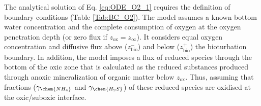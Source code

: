 \documentclass[gmd, manuscript]{copernicus}
\begin{document}
The analytical solution of Eq. \eqref{eq:ODE_O2_1} requires the definition of boundary conditions (Table \ref{Tab:BC_O2}). 
The model assumes a known bottom water concentration and the complete consumption of oxygen at the oxygen penetration depth (or zero flux if $z_{\mathrm{ox}}=z_\infty$). 
It considers equal oxygen concentration and diffusive flux above ($z_{\mathrm{bio}}^-$) and 
below ($z_{\mathrm{bio}}^+$) the bioturbation boundary. In addition, the model imposes a flux of reduced species through the bottom of the oxic zone that is calculated as the reduced substances produced through anoxic mineralization 
of organic matter below $z_{\mathrm{ox}}$. Thus, assuming that fractions ($\gamma_{\chem{NH_4}}$ and $\gamma_{\chem{H_2S}}$) of these reduced species are oxidised at the oxic/suboxic interface.
\end{document}
